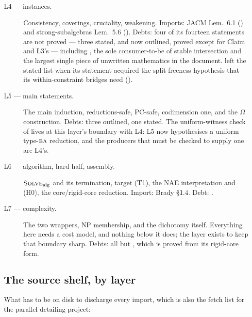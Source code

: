 \begin{description}
\item[L4 --- instances.] Consistency, coverings, cruciality, weakening.
Imports: JACM Lem.~6.1 () and
strong-subalgebras Lem.~5.6 (). Debts: four of
its fourteen statements are not proved --- three stated, and
 now outlined, proved except for
Claim  and L3's  --- including
, the sole consumer-to-be of stable
intersection and the largest single piece of unwritten mathematics in the
document.  left the stated list when its statement
acquired the split-freeness hypothesis that its within-constraint bridges
need ().

\item[L5 --- main statements.] The main induction, reductions-safe, PC-safe,
codimension one, and the $\Omega$ construction. Debts: three outlined, one
stated. The uniform-witness check of  lives at
this layer's boundary with L4: L5 now hypothesises a uniform type-$\textup{\textsc{ba}}$
reduction, and the producers that must be checked to supply one are L4's.

\item[L6 --- algorithm, hard half, assembly.] $\textsc{Solve}_{\mathrm{alg}}$
and its termination, target (T1), the NAE interpretation and (H0), the
core/rigid-core reduction. Import: Brady \S1.4. Debt: .

\item[L7 --- complexity.] The two wrappers, NP membership, and the dichotomy
itself. Everything here needs a cost model, and nothing below it does; the
layer exists to keep that boundary sharp. Debts: all but
, which is proved from its rigid-core form.

\end{description}

\subsection{The source shelf, by layer}

What has to be on disk to discharge every import, which is also the fetch
list for the parallel-detailing project:

